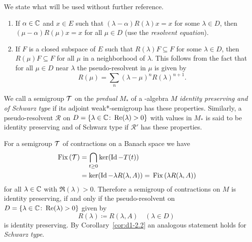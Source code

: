 We state what will be used without further reference.
\begin{enumerate}[\upshape(i), wide, labelindent=.25em]
\item 
If\/ $ \alpha \in \mathbb{C} $ and $ x \in E $ such that $ (\lambda - \alpha)R(\lambda)x = x $ for some $ \lambda \in D $, then $ (\mu - \alpha)R(\mu)x = x $ for all $ \mu \in D $ (use the \emph{resolvent equation}).

\item 
If\/ $ F $ is a closed subspace of\/ $ E $ such that $ R(\lambda)F \subseteq F $ for some $ \lambda \in D $, then $ R(\mu)F \subseteq F $ for all $ \mu $ in a neighborhood of\/ $ \lambda $.
This follows from the fact that for all $ \mu \in D $ near $ \lambda $ the pseudo-resolvent in $ \mu $ is given by
\[
R(\mu) = \sum_{n} (\lambda - \mu)^{n} R(\lambda)^{n+1}.
\]
\end{enumerate}
\begin{definition}\label{def:d1-2.5}
We call a semigroup $ \mathcal{T} $ on the \emph{predual} $ M_{*} $ of a \WA-algebra $ M $ \emph{identity preserving and of Schwarz type} if its adjoint weak*-semigroup has these properties.
Similarly, a pseudo-resolvent $ \mathcal{R} $ on $ D = \{\lambda \in \mathbb{C} \colon \mathop{}\!\mathrm{Re}(\lambda) > 0\} $ with values in $ M_{*} $ is said to be identity preserving and of Schwarz type if\/ $ \mathcal{R}' $ has these properties.
\end{definition}
For a semigroup $ \mathcal{T} $ of contractions on a Banach space we have
\begin{align*}
	\Fix{\TT} &= \bigcap_{t \geq 0} \ker(\Id  - T(t)) \\ 
			& = \ker(\Id - \lambda R(\lambda,A)) = \Fix{\lambda R(\lambda,A)}
\end{align*}
for all $ \lambda \in \mathbb{C} $ with $ \Re(\lambda) > 0 $.
Therefore a semigroup of contractions on $ M $ is identity preserving, if and only if the pseudo-resolvent on 
$ D = \{\lambda \in \mathbb{C} \colon \mathop{}\!\mathrm{Re}(\lambda) > 0\} $ given by
\[
	R(\lambda) \coloneq R(\lambda,A) \quad (\lambda \in D)
\]
is identity preserving.
By Corollary~\ref{cor:d1-2.2} an analogous statement holds for \emph{Schwarz type}.
